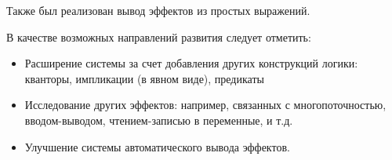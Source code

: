 Также был реализован вывод эффектов из простых выражений.

В качестве возможных направлений развития следует отметить:

\begin{itemize}
  \item Расширение системы за счет добавления других конструкций логики: кванторы, импликации (в явном виде), предикаты

  \item Исследование других эффектов: например, связанных с многопоточностью, вводом-выводом, чтением-записью в переменные, и т.д.

  \item Улучшение системы автоматического вывода эффектов.
\end{itemize}
